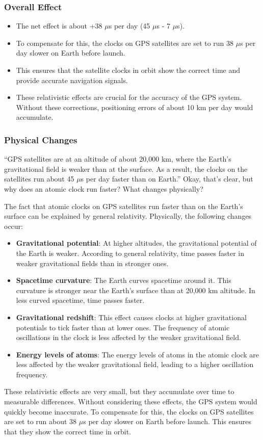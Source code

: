\documentclass[a4paper,12pt]{article}
\begin{document}
	\subsubsection{Overall Effect}
	\begin{itemize}
		\item The net effect is about +38 $\mu$s per day (45 $\mu$s - 7 $\mu$s).
		\item To compensate for this, the clocks on GPS satellites are set to run 38 $\mu$s per day slower on Earth before launch.
		\item This ensures that the satellite clocks in orbit show the correct time and provide accurate navigation signals.
		\item These relativistic effects are crucial for the accuracy of the GPS system. Without these corrections, positioning errors of about 10 km per day would accumulate.
	\end{itemize}
	
	\subsubsection{Physical Changes}
	``GPS satellites are at an altitude of about 20,000 km, where the Earth's gravitational field is weaker than at the surface. As a result, the clocks on the satellites run about 45 $\mu$s per day faster than on Earth.'' Okay, that's clear, but why does an atomic clock run faster? What changes physically?
	
	The fact that atomic clocks on GPS satellites run faster than on the Earth's surface can be explained by general relativity. Physically, the following changes occur:
	\begin{itemize}
		\item \textbf{Gravitational potential}: At higher altitudes, the gravitational potential of the Earth is weaker. According to general relativity, time passes faster in weaker gravitational fields than in stronger ones.
		\item \textbf{Spacetime curvature}: The Earth curves spacetime around it. This curvature is stronger near the Earth's surface than at 20,000 km altitude. In less curved spacetime, time passes faster.
		\item \textbf{Gravitational redshift}: This effect causes clocks at higher gravitational potentials to tick faster than at lower ones. The frequency of atomic oscillations in the clock is less affected by the weaker gravitational field.
		\item \textbf{Energy levels of atoms}: The energy levels of atoms in the atomic clock are less affected by the weaker gravitational field, leading to a higher oscillation frequency.
	\end{itemize}
	These relativistic effects are very small, but they accumulate over time to measurable differences. Without considering these effects, the GPS system would quickly become inaccurate. To compensate for this, the clocks on GPS satellites are set to run about 38 $\mu$s per day slower on Earth before launch. This ensures that they show the correct time in orbit.
	
\end{document}

